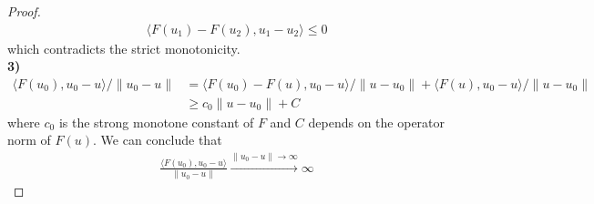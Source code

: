 \documentclass[a4paper,11pt,oneside,fleqn]{book}
\theoremstyle{definition}
\theoremstyle{remark}
\begin{document}
\begin{proof}
\begin{align*}
	\langle F(u_1) - F(u_2), u_1 - u_2 \rangle \le 0
\end{align*}
which contradicts the strict monotonicity. \\
\textbf{3)}
\begin{align*}
	\langle F(u_0), u_0 - u \rangle \slash \|u_0 - u\|
	&= \langle F(u_0) - F(u), u_0 - u \rangle  \slash \|u - u_0 \| + \langle F(u), u_0 - u \rangle \slash \|u - u_0\|\\
	&\ge c_0 \|u - u_0\| + C
\end{align*}
where $c_0$ is the strong monotone constant of $F$ and $C$ depends on the operator norm of $F(u)$. We can conclude that
\begin{align*}
	\frac{\langle F(u_0), u_0 - u \rangle }{\|u_0 - u\|} \overset{\|u_0 -u\| \rightarrow \infty}{\longrightarrow} \infty
\end{align*}
\end{proof}
\end{document}
